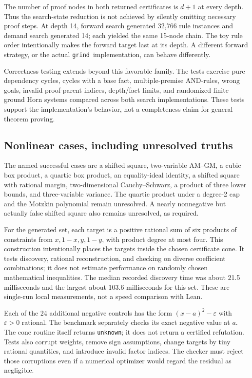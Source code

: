 \documentclass[11pt,a4paper]{article}
\newcommand{\grind}{\texttt{grind}}
\newcommand{\code}[1]{\texttt{\small #1}}
\begin{document}


The number of proof nodes in both returned certificates is $d+1$ at every
depth. Thus the search-state reduction is not achieved by silently omitting
necessary proof steps. At depth 14, forward search generated 32,766 rule
instances and demand search generated 14; each yielded the same 15-node chain.
The toy rule order intentionally makes the forward target last at its depth.
A different forward strategy, or the actual \grind\ implementation, can behave
differently.

Correctness testing extends beyond this favorable family. The tests exercise
pure dependency cycles, cycles with a base fact, multiple-premise AND-rules,
wrong goals, invalid proof-parent indices, depth/fact limits, and randomized
finite ground Horn systems compared across both search implementations.
These tests support the implementation's behavior, not a completeness claim
for general theorem proving.

\subsection{Nonlinear cases, including unresolved truths}

The named successful cases are a shifted square, two-variable AM--GM, a cubic
box product, a quartic box product, an equality-ideal identity, a shifted square
with rational margin, two-dimensional Cauchy--Schwarz, a product of three lower
bounds, and three-variable variance. The quartic product under a degree-2 cap
and the Motzkin polynomial remain unresolved. A nearly nonnegative but actually
false shifted square also remains unresolved, as required.

For the generated set, each target is a positive rational sum of six products
of constraints from $x,1-x,y,1-y$, with product degree at most four. This
construction intentionally places the targets inside the chosen certificate
cone. It tests discovery, rational reconstruction, and checking on diverse
coefficient combinations; it does not estimate performance on randomly chosen
mathematical inequalities. The median recorded discovery time was about
21.5 milliseconds and the largest about 103.6 milliseconds for this set.
These are single-run local measurements, not a speed comparison with Lean.

Each of the 24 additional negative controls has the form
$(x-a)^2-\varepsilon$ with $\varepsilon>0$ rational. The benchmark separately
checks its exact negative value at $a$. The cone routine itself returns
\code{unknown}; it does not return a certified refutation. Tests also corrupt
weights, remove sign assumptions, change targets by tiny rational quantities,
and introduce invalid factor indices. The checker must reject those corruptions
even if a numerical optimizer would regard the residual as negligible.
\end{document}
